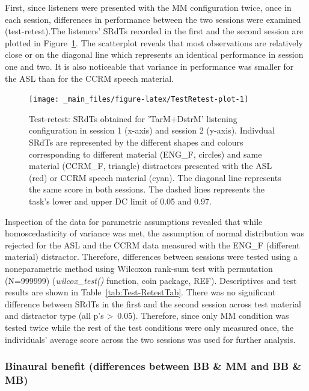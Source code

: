 \documentclass[a4paper, twoside]{templates/ociamthesis}
\begin{document}
\hfill\break
First, since listeners were presented with the MM configuration twice, once in each session, differences in performance between the two sessions were examined (test-retest).The listeners' SRdTs recorded in the first and the second session are plotted in Figure~\ref{fig:TestRetest-plot}. The scatterplot reveals that most observations are relatively close or on the diagonal line which represents an identical performance in session one and two. It is also noticeable that variance in performance was smaller for the ASL than for the CCRM speech material.

\begin{figure}

{\centering \texttt{[image: \_main\_files/figure-latex/TestRetest-plot-1]} 

}

\caption{Test-retest: SRdTs obtained for 'TarM+DstrM' listening configuration in session 1 (x-axis) and session 2 (y-axis). Indivdual SRdTs are represented by the different shapes and colours corresponding to different material (ENG\_F, circles) and same material (CCRM\_F, triangle) distractors presented with the ASL (red) or CCRM speech material (cyan). The diagonal line represents the same score in both sessions. The dashed lines represents the task's lower and upper DC limit of 0.05 and 0.97.}\label{fig:TestRetest-plot}
\end{figure}

Inspection of the data for parametric assumptions revealed that while homoscedasticity of variance was met, the assumption of normal distribution was rejected for the ASL and the CCRM data measured with the ENG\_F (different material) distractor. Therefore, differences between sessions were tested using a noneparametric method using Wilcoxon rank-sum test with permutation (N=999999) (\emph{wilcox\_test()} function, coin package, REF). Descriptives and test results are shown in Table~\ref{tab:Test-RetestTab}. There was no significant difference between SRdTs in the first and the second session across test material and distractor type (all p's \textgreater~0.05). Therefore, since only MM condition was tested twice while the rest of the test conditions were only measured once, the individuals' average score across the two sessions was used for further analysis.

\hypertarget{binaural-benefit-differences-between-bb-mm-and-bb-mb}{%
\subsubsection{Binaural benefit (differences between BB \& MM and BB \& MB)}\label{binaural-benefit-differences-between-bb-mm-and-bb-mb}}
\end{document}
